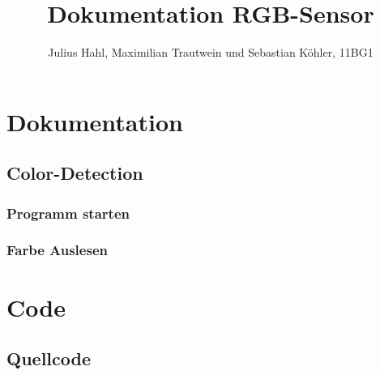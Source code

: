 \documentclass[10pt,a4paper]{report}
\title{Dokumentation RGB-Sensor}
\author{Julius Hahl, Maximilian Trautwein und Sebastian Köhler, 11BG1}
\begin{document}
	\maketitle
	\newpage
	\tableofcontents
	\newpage
	
	
	\part{Dokumentation}
	\chapter{Color-Detection}
	\newpage
	\section{Programm starten}
	\newpage
	\section{Farbe Auslesen}
	\newpage
	
	
	
	\part{Code}
	\chapter{Quellcode}
	
	
	\newpage
\end{document}
